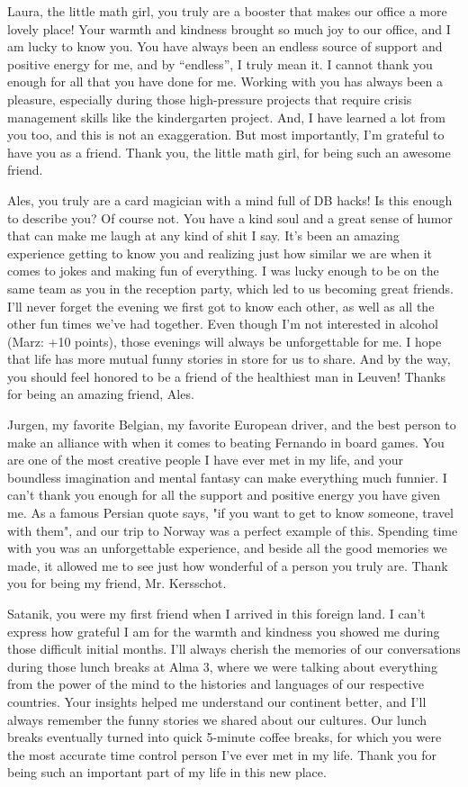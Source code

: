 Laura, the little math girl, you truly are a booster that makes our office a more lovely place! Your warmth and kindness brought so much joy to our office, and I am lucky to know you. You have always been an endless source of support and positive energy for me, and by ``endless'', I truly mean it.  I cannot thank you enough for all that you have done for me. Working with you has always been a pleasure, especially during those high-pressure projects that require crisis management skills like the kindergarten project. And, I have learned a lot from you too, and this is not an exaggeration. But most importantly, I'm grateful to have you as a friend. Thank you, the little math girl, for being such an awesome friend.

Ales, you truly are a card magician with a mind full of DB hacks! Is this enough to describe you? Of course not. You have a kind soul and a great sense of humor that can make me laugh at any kind of shit I say. It's been an amazing experience getting to know you and realizing just how similar we are when it comes to jokes and making fun of everything. I was lucky enough to be on the same team as you in the reception party, which led to us becoming great friends. I'll never forget the evening we first got to know each other, as well as all the other fun times we've had together. Even though I'm not interested in alcohol (Marz: +10 points), those evenings will always be unforgettable for me. I hope that life has more mutual funny stories in store for us to share. And by the way, you should feel honored to be a friend of the healthiest man in Leuven! Thanks for being an amazing friend, Ales.

Jurgen, my favorite Belgian, my favorite European driver, and the best person to make an alliance with when it comes to beating Fernando in board games. You are one of the most creative people I have ever met in my life, and your boundless imagination and mental fantasy can make everything much funnier. I can't thank you enough for all the support and positive energy you have given me. As a famous Persian quote says, "if you want to get to know someone, travel with them", and our trip to Norway was a perfect example of this. Spending time with you was an unforgettable experience, and beside all the good memories we made, it allowed me to see just how wonderful of a person you truly are. Thank you for being my friend, Mr. Kersschot.

Satanik, you were my first friend when I arrived in this foreign land. I can't express how grateful I am for the warmth and kindness you showed me during those difficult initial months. I'll always cherish the memories of our conversations during those lunch breaks at Alma 3, where we were talking about everything from the power of the mind to the histories and languages of our respective countries. Your insights helped me understand our continent better, and I'll always remember the funny stories we shared about our cultures. Our lunch breaks eventually turned into quick 5-minute coffee breaks, for which you were the most accurate time control person I've ever met in my life. Thank you for being such an important part of my life in this new place.

